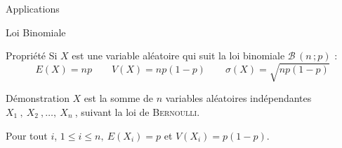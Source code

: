 \documentclass{cours}
\begin{document}
    \pagebreak
    \begin{Gpartie}{Applications} 
        \begin{Spartie}{Loi Binomiale} 
            \begin{SSpartie}{Propriété} 
                Si $X$ est une variable aléatoire qui suit la loi binomiale $\mathcal{B}\,\left(n\,; p\right)$ : \[E(X)=np\qquad V(X)=np\left(1-p\right)\qquad\sigma(X)=\sqrt{np\left(1-p\right)}\]
                \begin{SSSpartie}{Démonstration} 
                    $X$ est la somme de $n$ variables aléatoires indépendantes $X_1~,~X_2~,\dotsc,~X_n~$, suivant la loi de \textsc{Bernoulli}.

                    Pour tout $i$, $1\leq i\leq n,~E\left(X_i\right)=p$ et $V\left(X_i\right)=p\left(1-p\right)$.


\end{SSSpartie}
\end{SSpartie}
\end{Spartie}
\end{Gpartie}
\end{document}

